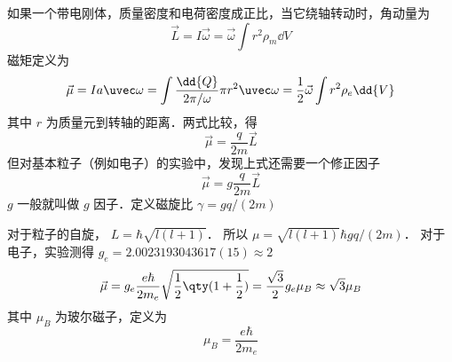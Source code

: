 
如果一个带电刚体，质量密度和电荷密度成正比，当它绕轴转动时，角动量为
\begin{equation}
\vec L = I\vec \omega  = \vec \omega \int r^2 \rho_m \dd{V}
\end{equation}
磁矩定义为
\begin{equation}
\vec \mu  = Ia \uvec\omega = \int \frac{\dd{Q}}{2\pi/\omega}  \pi r^2 \uvec \omega
= \frac 12 \vec \omega \int r^2\rho_e \dd{V} 
\end{equation}
其中 $r$ 为质量元到转轴的距离．两式比较，得
\begin{equation}
\vec \mu  = \frac{q}{2m} \vec L
\end{equation}
但对基本粒子（例如电子）的实验中，发现上式还需要一个修正因子
\begin{equation}
\vec \mu  = g\frac{q}{2m}\vec L
\end{equation}
$g$ 一般就叫做 $g$ 因子．定义磁旋比 $\gamma  = gq/(2m)$

对于粒子的自旋， $L = \hbar \sqrt{l(l + 1)} $． 所以 $\mu = \sqrt{l (l + 1)} \hbar gq/(2m)$． 
对于电子，实验测得 $g_e = 2.0023193043617(15) \approx 2$ 
\begin{equation}
\vec \mu  = g_e \frac{e\hbar}{2 m_e} \sqrt{\frac12 \qty(1 + \frac 12)}  = \frac{\sqrt 3}{2} g_e \mu_B \approx \sqrt 3 \mu_B
\end{equation}
其中 $\mu_B$ 为玻尔磁子，定义为
\begin{equation}
\mu_B = \frac{e\hbar}{2 m_e}
\end{equation}

